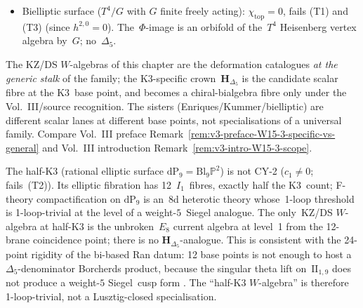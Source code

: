 \begin{remark}
\begin{itemize}
 $\Phi$-image with $\mathbf{H}_{\Delta_5}$ restricted to the Kummer
 sublattice~$\Lambda_{\mathrm{Kum}}\subset \mathrm{II}_{3,19}$
 requires the Vol.~III/source recognition of $\mathbf{H}_{\Delta_5}$
 and a chain-compatible Kummer sublattice comparison.
\item Bielliptic surface ($T^4/G$ with $G$ finite freely acting):
 $\chi_{\mathrm{top}} = 0$, fails (T1) and (T3) (since $h^{2,0} = 0$).
 The~$\Phi$-image is an orbifold of the~$T^4$ Heisenberg vertex
 algebra by~$G$; no~$\Delta_5$.
\end{itemize}
The KZ/DS $W$-algebras of this chapter are the deformation
catalogues \emph{at the generic stalk} of the family; the
K3-specific crown~$\mathbf{H}_{\Delta_5}$ is the candidate scalar fibre
at the K3~base point, and becomes a chiral-bialgebra fibre only under
the Vol.~III/source recognition. The sisters
(Enriques/Kummer/bielliptic) are different scalar lanes at different
base points, not specialisations of a universal family. Compare Vol.~III preface
Remark~\ref{rem:v3-preface-W15-3-specific-vs-general} and
Vol.~III introduction
Remark~\ref{rem:v3-intro-W15-3-scope}.
\end{remark}

\begin{remark}[Half-K3 $= \mathrm{dP}_9$ is not CY-2; 12 fibres, not 24]
\label{rem:wac-W15-2-halfK3}
The half-K3 (rational elliptic surface
$\mathrm{dP}_9 = \mathrm{Bl}_9\mathbb{P}^2$) is not CY-2
($c_1\ne 0$; fails~(T2)). Its elliptic fibration has 12~$I_1$~fibres,
exactly half the K3~count; F-theory compactification on
$\mathrm{dP}_9$ is an~8d heterotic theory whose~1-loop threshold is
1-loop-trivial at the level of a weight-$5$~Siegel analogue.
The only~KZ/DS $W$-algebra at half-K3 is the
unbroken~$E_8$ current algebra at level~1 from the 12-brane
coincidence point; there is no $\mathbf{H}_{\Delta_5}$-analogue.
This is consistent with the 24-point rigidity of the bi-based Ran
datum: 12 base points is not enough to host a $\Delta_5$-denominator
Borcherds product, because the singular theta lift
on~$\mathrm{II}_{1,9}$ does not produce a weight-$5$ Siegel~cusp form
\cite{MorrisonVafa1996II,Borcherds1998}. The ``half-K3
$W$-algebra'' is therefore 1-loop-trivial, not a Lusztig-closed
specialisation.
\end{remark}

